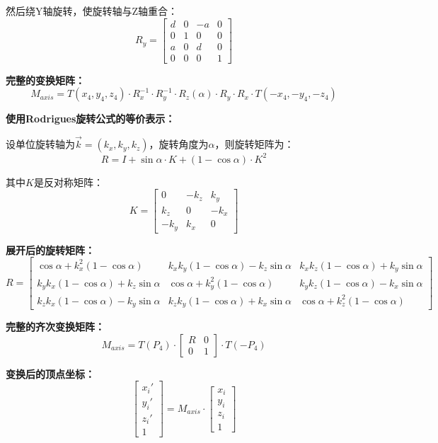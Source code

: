 \documentclass[12pt,a4paper]{article}
\begin{document}
然后绕Y轴旋转，使旋转轴与Z轴重合：
\[
R_y = \begin{bmatrix}
d & 0 & -a & 0 \\
0 & 1 & 0 & 0 \\
a & 0 & d & 0 \\
0 & 0 & 0 & 1
\end{bmatrix}
\]

\textbf{完整的变换矩阵：}
\[
M_{axis} = T(x_4, y_4, z_4) \cdot R_x^{-1} \cdot R_y^{-1} \cdot R_z(\alpha) \cdot R_y \cdot R_x \cdot T(-x_4, -y_4, -z_4)
\]

\textbf{使用Rodrigues旋转公式的等价表示：}

设单位旋转轴为$\vec{k} = (k_x, k_y, k_z)$，旋转角度为$\alpha$，则旋转矩阵为：
\[
R = I + \sin\alpha \cdot K + (1-\cos\alpha) \cdot K^2
\]

其中$K$是反对称矩阵：
\[
K = \begin{bmatrix}
0 & -k_z & k_y \\
k_z & 0 & -k_x \\
-k_y & k_x & 0
\end{bmatrix}
\]

\textbf{展开后的旋转矩阵：}
\[
R = \begin{bmatrix}
\cos\alpha + k_x^2(1-\cos\alpha) & k_xk_y(1-\cos\alpha) - k_z\sin\alpha & k_xk_z(1-\cos\alpha) + k_y\sin\alpha \\
k_yk_x(1-\cos\alpha) + k_z\sin\alpha & \cos\alpha + k_y^2(1-\cos\alpha) & k_yk_z(1-\cos\alpha) - k_x\sin\alpha \\
k_zk_x(1-\cos\alpha) - k_y\sin\alpha & k_zk_y(1-\cos\alpha) + k_x\sin\alpha & \cos\alpha + k_z^2(1-\cos\alpha)
\end{bmatrix}
\]

\textbf{完整的齐次变换矩阵：}
\[
M_{axis} = T(P_4) \cdot \begin{bmatrix} R & 0 \\ 0 & 1 \end{bmatrix} \cdot T(-P_4)
\]

\textbf{变换后的顶点坐标：}
\[
\begin{bmatrix} x_i' \\ y_i' \\ z_i' \\ 1 \end{bmatrix} = M_{axis} \cdot \begin{bmatrix} x_i \\ y_i \\ z_i \\ 1 \end{bmatrix}
\]
\end{document}
